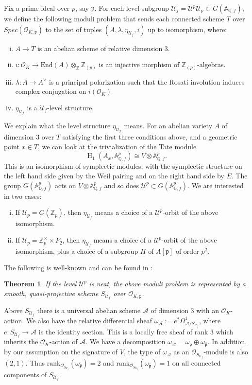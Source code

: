 \documentclass[12pt,a4paper,reqno]{amsart}
\theoremstyle{definition}
\numberwithin{definition}{subsection}
\theoremstyle{definition}
\numberwithin{Definition}{subsection}
\theoremstyle{remark}
\theoremstyle{remark}
\numberwithin{Remark}{subsection}
\theoremstyle{remark}
\theoremstyle{plain}
\newtheorem{Theorem}{Theorem}
\numberwithin{Theorem}{subsection}
\theoremstyle{plain}
\theoremstyle{plain}
\theoremstyle{plain}
\theoremstyle{plain}
\theoremstyle{plain}
\theoremstyle{plain}
\theoremstyle{plain}
\newcommand*{\Z}{\mathbb{Z}}
\newcommand*{\Q}{\mathbb{Q}}
\newcommand*{\A}{\mathbb{A}}
\DeclareMathOperator{\h}{H}
\begin{document}
Fix a prime ideal over $p$, say $\mathfrak{p}$. For each level subgroup $\mathcal{U}_f=\mathcal{U}^p\mathcal{U}_p\subset G(\A_{\Q,f})$, we define the following moduli problem that sends each connected scheme $T$ over $Spec(\mathcal{O}_{K,\mathfrak{p}})$ to the set of tuples $(A,\lambda, \eta_{\mathcal{U}_f},i)$ up to isomorphism, where:
\begin{enumerate}[(i)]
\item $A\to T$ is an abelian scheme of relative dimension $3$.
\item $i:\mathcal{O}_K\to \text{End}(A)\otimes_\Z \Z_{(p)}$ is an injective morphism of $\Z_{(p)}$-algebras.
\item $\lambda:A\to A^\vee$ is a principal polarization such that the Rosati involution induces complex conjugation on $i(\mathcal{O}_K)$
\item $\eta_{\mathcal{U}_f}$ is a $\mathcal{U}_f$-level structure.
\end{enumerate}
We explain what the level structure $\eta_{\mathcal{U}_f}$ means. For an abelian variety $A$ of dimension $3$ over $T$ satisfying the first three conditions above, and a geometric point $x\in T$, we can look at the trivialization of the Tate module
\[
\h_1(A_x,\A_{\Q,f}^p)\cong V\otimes\A_{\Q,f}^p.
\]
This is an isomorphism of symplectic modules, with the symplectic structure on the left hand side given by the Weil pairing and on the right hand side by $E$. The group $G(\A_{\Q,f}^p)$ acts on $V\otimes\A_{\Q,f}^p$ and so does $\mathcal{U}^p\subset G(\A_{\Q,f}^p)$. We are interested in two cases:
\begin{enumerate}[(i)]
\item If $\mathcal{U}_p=G(\Z_p)$, then $\eta_{\mathcal{U}_f}$ means a choice of a $\mathcal{U}^p$-orbit of the above isomorphism.
\item If $\mathcal{U}_p=\Z_p^\times\times P_2$, then $\eta_{\mathcal{U}_f}$ means a choice of a $\mathcal{U}^p$-orbit of the above isomorphism, plus a choice of a subgroup $H$ of $A[\mathfrak{p}]$ of order $p^2$.
\end{enumerate}
The following is well-known and can be found in \cite[I.4.1.11]{lan}:
\begin{Theorem}
If the level $\mathcal{U}^p$ is neat, the above moduli problem is represented by a smooth, quasi-projective scheme $S_{\mathcal{U}_f}$ over $\mathcal{O}_{K,\mathfrak{p}}$.
\end{Theorem}
Above $S_{\mathcal{U}_f}$ there is a universal abelian scheme $\mathcal{A}$ of dimension $3$ with an $\mathcal{O}_K$-action. We also have the relative differential sheaf $\omega_{\mathcal{A}}:=e^*\Omega^1_{\mathcal{A}/S_{\mathcal{U}_f}}$, where $e:S_{\mathcal{U}_f}\to \mathcal{A}$ is the identity section. This is a locally free sheaf of rank $3$ which inherits the $\mathcal{O}_K$-action
of $\mathcal{A}$. We have a decomposition $\omega_{\mathcal{A}} = \omega_{\mathfrak{p}} \oplus \omega_{\overline{\mathfrak{p}}}$.
In addition, by our assumption on the signature of $V$, the type of $\omega_{\mathcal{A}}$ as an $\mathcal{O}_{S_{\mathcal{U}_f}}$-module is also $(2, 1)$. Thus $\text{rank}_{\mathcal{O}_{S_{\mathcal{U}_f}}}
(\omega_{\mathfrak{p}}) = 2$ and $\text{rank}_{\mathcal{O}_{S_{\mathcal{U}_f}}}
(\omega_{\overline{\mathfrak{p}}}) = 1$
on all connected components of $S_{\mathcal{U}_f}$.
\end{document}
